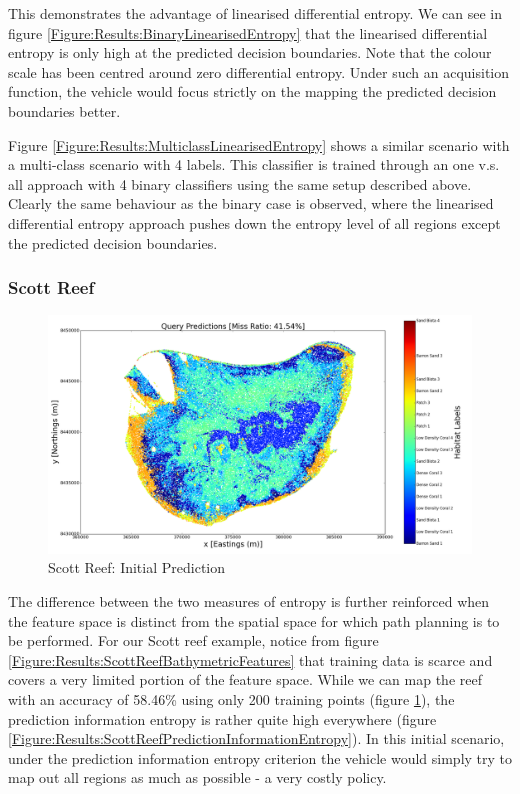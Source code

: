 \documentclass{article}
\begin{document}
		This demonstrates the advantage of linearised differential entropy. We can see in figure \ref{Figure:Results:BinaryLinearisedEntropy} that the linearised differential entropy is only high at the predicted decision boundaries. Note that the colour scale has been centred around zero differential entropy. Under such an acquisition function, the vehicle would focus strictly on the mapping the predicted decision boundaries better.
		
		Figure \ref{Figure:Results:MulticlassLinearisedEntropy} shows a similar scenario with a multi-class scenario with 4 labels. This classifier is trained through an one v.s. all approach with 4 binary classifiers using the same setup described above. Clearly the same behaviour as the binary case is observed, where the linearised differential entropy approach pushes down the entropy level of all regions except the predicted decision boundaries.
		
		\subsubsection{Scott Reef}
		
			\begin{figure}[!htbp]
			\centering
				\includegraphics[width = \linewidth]{Figures/scott_reef_modeling/Figure8.png}
			\caption{Scott Reef: Initial Prediction}
			\label{Figure:Results:ScottReefInitialPredictions}
			\end{figure}
			
			The difference between the two measures of entropy is further reinforced when the feature space is distinct from the spatial space for which path planning is to be performed. For our Scott reef example, notice from figure \ref{Figure:Results:ScottReefBathymetricFeatures} that training data is scarce and covers a very limited portion of the feature space. While we can map the reef with an accuracy of 58.46\% using only 200 training points (figure \ref{Figure:Results:ScottReefInitialPredictions}), the prediction information entropy is rather quite high everywhere (figure \ref{Figure:Results:ScottReefPredictionInformationEntropy}). In this initial scenario, under the prediction information entropy criterion the vehicle would simply try to map out all regions as much as possible - a very costly policy.
			
\end{document}
